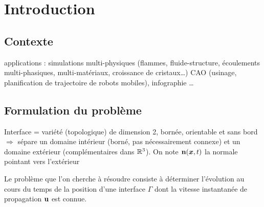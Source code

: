 \def\chapterabstract{}
\chapter{Introduction}

\section{Contexte}%

applications : simulations multi-physiques (flammes, fluide-structure, écoulements multi-phasiques, multi-matériaux, croissance de cristaux\ldots) CAO (usinage, planification de trajectoire de robots mobiles), infographie \ldots


\section{Formulation du problème}%
Interface = variété (topologique) de dimension 2, bornée, orientable et sans bord $\Rightarrow$ sépare un domaine intérieur (borné, pas nécessairement connexe) et un domaine extérieur (complémentaires dans $\mathbb{R}^3$). On note $\mathbf{n}(\boldsymbol{x},t)$ la normale pointant vers l'extérieur
\par\bigskip



Le problème que l'on cherche à résoudre consiste à déterminer l'évolution au cours du temps de la position d'une interface $\Gamma$ dont la vitesse instantanée de propagation $\mathbf{u}$ est connue.
